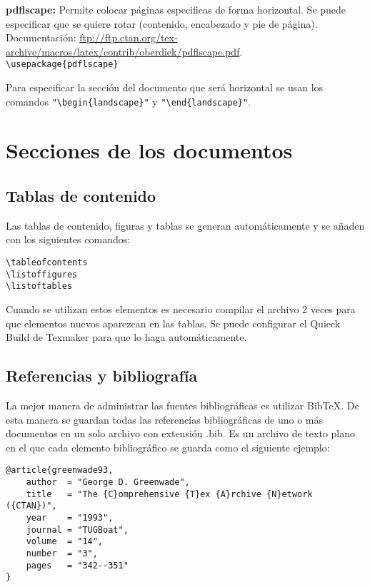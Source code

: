 \documentclass[12pt, a4paper,twoside]{article} %
\begin{document}
\textbf{pdflscape:} Permite colocar páginas especificas de forma horizontal. Se puede especificar que se quiere rotar (contenido, encabezado y pie de página). Documentación: \url{ftp://ftp.ctan.org/tex-archive/macros/latex/contrib/oberdiek/pdflscape.pdf}.\\

\noindent\lstinline$\usepackage{pdflscape}$

\vspace{12pt}
Para especificar la sección del documento que será horizontal se usan los comandos \lstinline$"\begin{landscape}"$ y \lstinline$"\end{landscape}"$.

\section{Secciones de los documentos}

\subsection{Tablas de contenido}

Las tablas de contenido, figuras y tablas se generan automáticamente y se añaden con los siguientes comandos:

\begin{lstlisting}
\tableofcontents
\listoffigures
\listoftables
\end{lstlisting}

Cuando se utilizan estos elementos es necesario compilar el archivo 2 veces para que elementos nuevos aparezcan en las tablas. Se puede configurar el Quieck Build de Texmaker para que lo haga automáticamente.

\subsection{Referencias y bibliografía}

La mejor manera de administrar las fuentes bibliográficas es utilizar BibTeX. De esta manera se guardan todas las referencias bibliográficas de uno o más documentos en un solo archivo con extensión .bib. Es un archivo de texto plano en el que cada elemento bibliográfico se guarda como el siguiente ejemplo:

\begin{lstlisting}
@article{greenwade93,
    author  = "George D. Greenwade",
    title   = "The {C}omprehensive {T}ex {A}rchive {N}etwork ({CTAN})",
    year    = "1993",
    journal = "TUGBoat",
    volume  = "14",
    number  = "3",
    pages   = "342--351"
}
\end{lstlisting}
\end{document}
